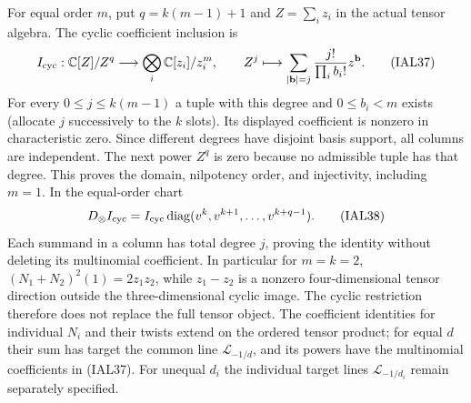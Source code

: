 \documentclass[11pt,a4paper]{article}
\theoremstyle{definition}
\begin{document}
For equal order $m$, put $q=k(m-1)+1$ and $Z=\sum_i z_i$ in the actual
tensor algebra.  The cyclic coefficient inclusion is
\begin{equation}
 I_{\rm cyc}:\mathbb C[Z]/Z^q\longrightarrow
          \bigotimes_i\mathbb C[z_i]/z_i^m,
 \qquad Z^j\longmapsto
   \sum_{|\mathbf b|=j}\frac{j!}{\prod_i b_i!}z^{\mathbf b}.
                                                        \tag{IAL37}
\end{equation}
For every $0\leq j\leq k(m-1)$ a tuple with this degree and
$0\leq b_i<m$ exists (allocate $j$ successively to the $k$ slots).
Its displayed coefficient is nonzero in characteristic zero.  Since
different degrees have disjoint basis support, all columns are
independent.  The next power $Z^q$ is zero because no admissible tuple
has that degree.  This proves the domain, nilpotency order, and
injectivity, including $m=1$.  In the equal-order chart
\begin{equation}
 D_{\otimes}I_{\rm cyc}
 =I_{\rm cyc}\operatorname{diag}(v^k,v^{k+1},\ldots,v^{k+q-1}).
                                                        \tag{IAL38}
\end{equation}
Each summand in a column has total degree $j$, proving the identity
without deleting its multinomial coefficient.  In particular for
$m=k=2$, $(N_1+N_2)^2(1)=2z_1z_2$, while $z_1-z_2$ is a nonzero
four-dimensional tensor direction outside the three-dimensional
cyclic image.  The cyclic restriction therefore does not replace
the full tensor object.  The coefficient identities for individual
$N_i$ and their twists extend on the ordered tensor product; for
equal $d$ their sum has target the common line $\mathcal L_{-1/d}$,
and its powers have the multinomial coefficients in (IAL37).  For
unequal $d_i$ the individual target lines $\mathcal L_{-1/d_i}$
remain separately specified.
\end{document}
